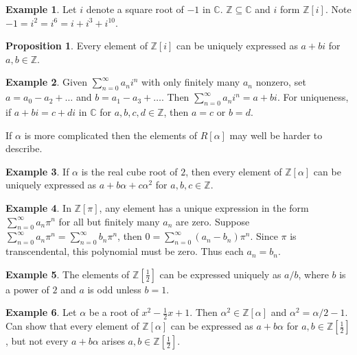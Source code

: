 \documentclass{article}
\newcommand{\Z}{\mathbb{Z}}
\newcommand{\C}{\mathbb{C}}
\newcommand{\rb}[1]{\left( #1 \right)}
\renewcommand{\sb}[1]{\left[ #1 \right]}
\theoremstyle{definition}\newtheorem{definition}{Definition}[subsection]
\theoremstyle{definition}\newtheorem{remark}[definition]{Remark}
\theoremstyle{definition}\newtheorem*{example}{Example}
\theoremstyle{definition}\newtheorem*{note}{Note}
\newtheorem{proposition}[definition]{Proposition}
\begin{document}
\begin{example}
Let $ i $ denote a square root of $ -1 $ in $ \C $. $ \Z \subseteq \C $ and $ i $ form $ \Z\sb{i} $. Note $ -1 = i^2 = i^6 = i + i^3 + i^{10} $.
\end{example}

\begin{proposition}
Every element of $ \Z\sb{i} $ can be uniquely expressed as $ a + bi $ for $ a, b \in \Z $.
\end{proposition}

\begin{example}
Given $ \sum_{n = 0}^\infty a_ni^n $ with only finitely many $ a_n $ nonzero, set $ a = a_0 - a_2 + \dots $ and $ b = a_1 - a_3 + \dots $. Then $ \sum_{n = 0}^\infty a_ni^n = a + bi $. For uniqueness, if $ a + bi = c + di $ in $ \C $ for $ a, b, c, d \in \Z $, then $ a = c $ or $ b = d $.
\end{example}

If $ \alpha $ is more complicated then the elements of $ R\sb{\alpha} $ may well be harder to describe.

\begin{example}
If $ \alpha $ is the real cube root of $ 2 $, then every element of $ \Z\sb{\alpha} $ can be uniquely expressed as $ a + b\alpha + c\alpha^2 $ for $ a, b, c \in \Z $.
\end{example}

\begin{example}
In $ \Z\sb{\pi} $, any element has a unique expression in the form $ \sum_{n = 0}^\infty a_n\pi^n $ for all but finitely many $ a_n $ are zero. Suppose $ \sum_{n = 0}^\infty a_n\pi^n = \sum_{n = 0}^\infty b_n\pi^n $, then $ 0 = \sum_{n = 0}^\infty \rb{a_n - b_n}\pi^n $. Since $ \pi $ is transcendental, this polynomial must be zero. Thus each $ a_n = b_n $.
\end{example}

\begin{example}
The elements of $ \Z\sb{\tfrac{1}{2}} $ can be expressed uniquely as $ a / b $, where $ b $ is a power of $ 2 $ and $ a $ is odd unless $ b = 1 $.
\end{example}

\begin{example}
Let $ \alpha $ be a root of $ x^2 - \tfrac{1}{2}x + 1 $. Then $ \alpha^2 \in \Z\sb{\alpha} $ and $ \alpha^2 = \alpha / 2 - 1 $. Can show that every element of $ \Z\sb{\alpha} $ can be expressed as $ a + b\alpha $ for $ a, b \in \Z\sb{\tfrac{1}{2}} $, but not every $ a + b\alpha $ arises $ a, b \in \Z\sb{\tfrac{1}{2}} $.
\end{example}
\end{document}
